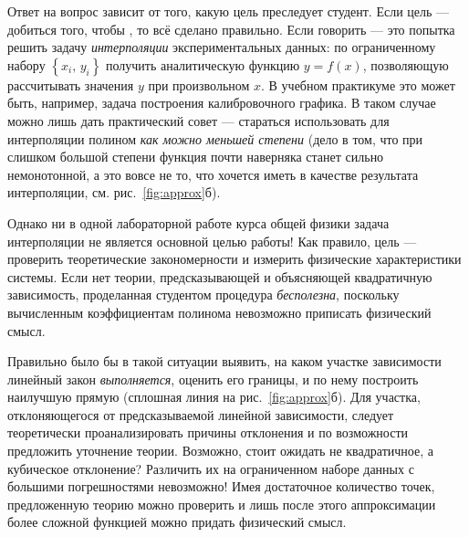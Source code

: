 \begin{longnote}
    Ответ на вопрос зависит от того, какую цель преследует
    студент. Если цель --- добиться того, чтобы , то всё сделано правильно.
    Если говорить  ---
    это попытка решить задачу \emph{интерполяции}
    экспериментальных данных: по ограниченному набору $\left\{
x_{i},\,y_{i}\right\} $
    получить аналитическую функцию $y=f\!\left(x\right)$, позволяющую
    рассчитывать значения $y$ при произвольном $x$. В учебном практикуме
    это может быть, например, задача построения калибровочного графика.
    В таком случае можно лишь дать практический совет --- стараться
    использовать для интерполяции полином \emph{как можно
    меньшей степени} (дело в том, что при слишком большой
    степени функция почти наверняка станет сильно немонотонной, а это
    вовсе не то, что хочется иметь в качестве результата интерполяции,
    см. рис.~\ref{fig:approx}б).

    Однако ни в одной лабораторной работе курса общей
    физики задача интерполяции не является основной целью работы! Как
    правило, цель --- проверить теоретические закономерности
    и измерить физические характеристики системы. Если нет теории,
предсказывающей
    и объясняющей квадратичную зависимость, проделанная студентом процедура
    \emph{бесполезна}, поскольку вычисленным коэффициентам полинома
невозможно 
    приписать физический смысл.

    Правильно было бы в такой ситуации выявить, на каком
    участке зависимости линейный закон \emph{выполняется},
    оценить его границы, и по нему построить наилучшую прямую (сплошная
    линия на рис.~\ref{fig:approx}б). Для участка, отклоняющегося от
    предсказываемой линейной зависимости, следует теоретически проанализировать
    причины отклонения и по возможности предложить уточнение теории. Возможно,
    стоит ожидать не квадратичное, а кубическое отклонение? Различить
    их на ограниченном наборе данных с большими погрешностями невозможно!
    Имея достаточное количество точек, предложенную теорию можно проверить
    и лишь после этого аппроксимации более сложной функцией можно придать
    физический смысл.
\end{longnote}
